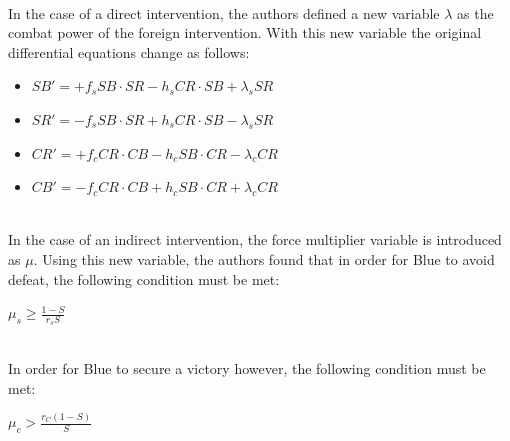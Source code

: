 \documentclass{article}
\begin{document}
\medskip
\\In the case of a direct intervention, the authors defined a new variable $\lambda$ as the combat power of the foreign intervention. With this new variable the original differential equations change as follows:
\begin{itemize}
    \item $SB' = +f_sSB \cdot SR - h_sCR \cdot SB + \lambda_sSR$
    \item $SR' = -f_sSB \cdot SR + h_sCR \cdot SB - \lambda_sSR$
    \item $CR' = +f_cCR \cdot CB - h_cSB \cdot CR - \lambda_cCR$
    \item $CB' = -f_cCR \cdot CB + h_cSB \cdot CR + \lambda_cCR$
\end{itemize}
\medskip
\\In the case of an indirect intervention, the force multiplier variable is introduced as $\mu$. Using this new variable, the authors found that in order for Blue to avoid defeat, the following condition must be met:
\begin{center}
    $\mu_s \ge \frac{1-S}{r_sS}$
\end{center}
\medskip
\\In order for Blue to secure a victory however, the following condition must be met:
\begin{center}
    $\mu_c > \frac{r_C(1-S)}{S}$
\end{center}
\end{document}
